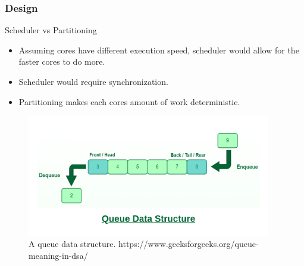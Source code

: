 \begin{frame}[hoved]
	\frametitle{Design}
	\begin{minipage}[t]{0.45\textwidth}
		{\large Scheduler vs Partitioning}
    \begin{itemize}
      \item Assuming cores have different execution speed, scheduler would allow
        for the faster cores to do more.
      \item Scheduler would require synchronization.
      \item Partitioning makes each cores amount of work deterministic.
    \end{itemize}
	\end{minipage}
	\hfill
	\begin{minipage}[t]{0.45\textwidth}
		\begin{figure}
			\begin{center}
				\includegraphics[width=0.95\textwidth]{figures/queue.png}
			\end{center}
			\caption{A queue data structure. \tiny https://www.geeksforgeeks.org/queue-meaning-in-dsa/}\label{fig:queue}
		\end{figure}
	\end{minipage}
\end{frame}

